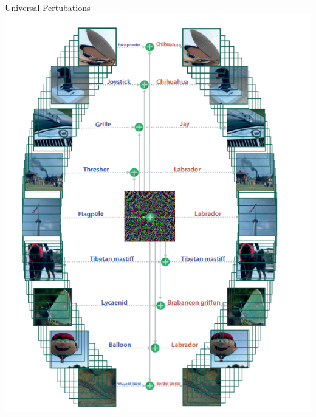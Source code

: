 \documentclass{beamer}
\begin{document}
\begin{frame}{Universal Pertubations}
  \center \includegraphics[height=\textheight]{fig/universal-pertubation.png}
\end{frame}
\end{document}
